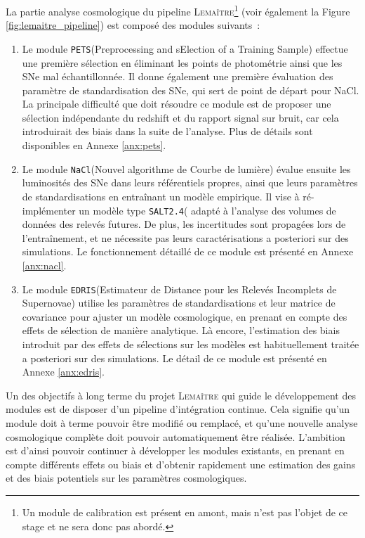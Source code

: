 \documentclass{book}
\def\lemaitre{\textsc{Lemaître}\xspace}
\def\pets{\texttt{PETS}\xspace}
\def\nacl{\texttt{NaCl}\xspace}
\def\edris{\texttt{EDRIS}\xspace}
\def\saltd{\texttt{SALT2.4}\xspace}
\begin{document}
La partie analyse cosmologique du pipeline \lemaitre \footnote{Un module de calibration est présent en amont, mais n'est pas l'objet de ce stage et ne sera donc pas abordé.} (voir également la Figure \ref{fig:lemaitre_pipeline}) est composé des modules suivants~:
\begin{enumerate}
    \item Le module \pets (Preprocessing and sElection of a Training Sample) effectue une première sélection en éliminant les points de photométrie ainsi que les SNe mal échantillonnée. Il donne également une première évaluation des paramètre de standardisation des SNe, qui sert de point de départ pour NaCl. La principale difficulté que doit résoudre ce module est de proposer une sélection indépendante du redshift et du rapport signal sur bruit, car cela introduirait des biais dans la suite de l'analyse. Plus de détails sont disponibles en Annexe \ref{anx:pets}.
    \item Le module \nacl (Nouvel algorithme de Courbe de lumière) évalue ensuite les luminosités des SNe dans leurs référentiels propres, ainsi que leurs paramètres de standardisations en entraînant un modèle empirique. Il vise à ré-implémenter un modèle type \saltd ( adapté à l'analyse des volumes de données des relevés futures. De plus, les incertitudes sont propagées lors de l'entraînement, et ne nécessite pas leurs caractérisations a posteriori sur des simulations. Le fonctionnement détaillé de ce module est présenté en Annexe \ref{anx:nacl}.
    \item Le module \edris (Estimateur de Distance pour les Relevés Incomplets de Supernovae) utilise les paramètres de standardisations et leur matrice de covariance pour ajuster un modèle cosmologique, en prenant en compte des effets de sélection de manière analytique. Là encore, l'estimation des biais introduit par des effets de sélections sur les modèles est habituellement traitée a posteriori sur des simulations. Le détail de ce module est présenté en Annexe \ref{anx:edris}.
\end{enumerate}

Un des objectifs à long terme du projet \lemaitre qui guide le développement des modules est de disposer d'un pipeline d'intégration continue. Cela signifie qu'un module doit à terme pouvoir être modifié ou remplacé, et qu'une nouvelle analyse cosmologique complète doit pouvoir automatiquement être réalisée. L'ambition est d'ainsi pouvoir continuer à développer les modules existants, en prenant en compte différents effets ou biais et d'obtenir rapidement une estimation des gains et des biais potentiels sur les paramètres cosmologiques.
\end{document}
